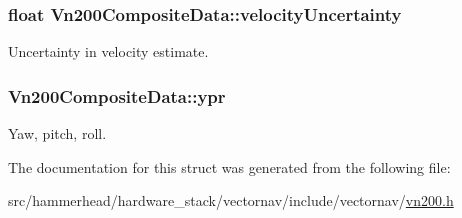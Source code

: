 \subsubsection[{\texorpdfstring{velocity\+Uncertainty}{velocityUncertainty}}]{\setlength{\rightskip}{0pt plus 5cm}float Vn200\+Composite\+Data\+::velocity\+Uncertainty}\hypertarget{structVn200CompositeData_a5d1a9ba2f962d0dad6ce14537f1a32e3}{}\label{structVn200CompositeData_a5d1a9ba2f962d0dad6ce14537f1a32e3}
Uncertainty in velocity estimate. 
\subsubsection[{\texorpdfstring{ypr}{ypr}}]{ Vn200\+Composite\+Data\+::ypr}\hypertarget{structVn200CompositeData_a8f4e24b29eebf6c831bd0d70a10245cf}{}\label{structVn200CompositeData_a8f4e24b29eebf6c831bd0d70a10245cf}
Yaw, pitch, roll. 

The documentation for this struct was generated from the following file\+:\begin{DoxyCompactItemize}
\item 
src/hammerhead/hardware\+\_\+stack/vectornav/include/vectornav/\hyperlink{vn200_8h}{vn200.\+h}\end{DoxyCompactItemize}
